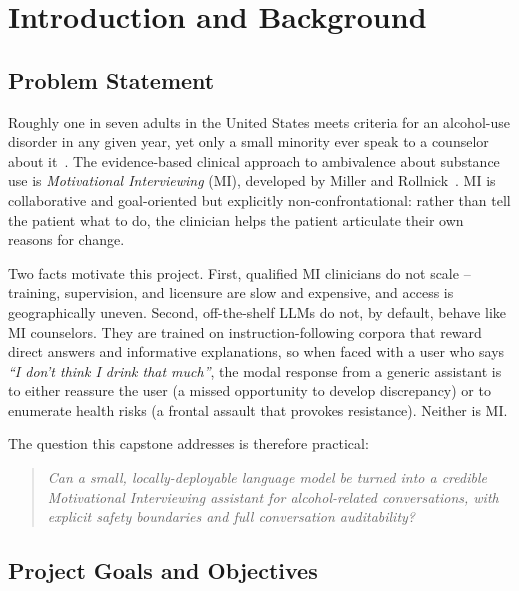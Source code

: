 \section{Introduction and Background}
\label{sec:introduction}

\subsection{Problem Statement}

Roughly one in seven adults in the United States meets criteria for an
alcohol-use disorder in any given year, yet only a small minority ever speak to
a counselor about it~\cite{niaaa2023}. The evidence-based clinical approach to
ambivalence about substance use is \textit{Motivational Interviewing} (MI),
developed by Miller and Rollnick~\cite{miller2013mi}. MI is collaborative and
goal-oriented but explicitly non-confrontational: rather than tell the patient
what to do, the clinician helps the patient articulate their own reasons for
change.

Two facts motivate this project. First, qualified MI clinicians do not scale --
training, supervision, and licensure are slow and expensive, and access is
geographically uneven. Second, off-the-shelf LLMs do not, by default, behave
like MI counselors. They are trained on instruction-following corpora that
reward direct answers and informative explanations, so when faced with a user
who says \textit{``I don't think I drink that much''}, the modal response from
a generic assistant is to either reassure the user (a missed opportunity to
develop discrepancy) or to enumerate health risks (a frontal assault that
provokes resistance). Neither is MI.

The question this capstone addresses is therefore practical:
\begin{quote}
\textit{Can a small, locally-deployable language model be turned into a
credible Motivational Interviewing assistant for alcohol-related conversations,
with explicit safety boundaries and full conversation auditability?}
\end{quote}

\subsection{Project Goals and Objectives}


